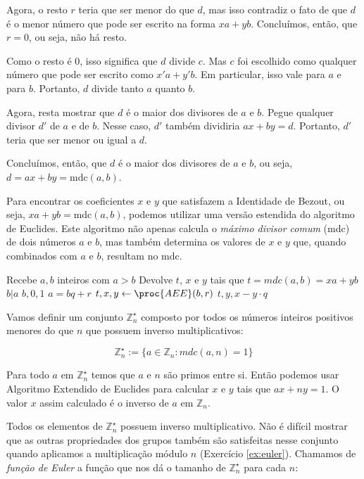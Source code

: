 Agora, o resto $r$ teria que ser menor do que $d$, mas isso contradiz o fato de que $d$ é o menor número que pode ser escrito na forma $xa + yb$.
Concluímos, então, que $r = 0$, ou seja, não há resto.

Como o resto é 0, isso significa que $d$ divide $c$.
Mas $c$ foi escolhido como qualquer número que pode ser escrito como $x'a + y'b$.
Em particular, isso vale para $a$ e para $b$.
Portanto, $d$ divide tanto $a$ quanto $b$.

Agora, resta mostrar que $d$ é o maior dos divisores de $a$ e $b$.
Pegue qualquer divisor $d'$ de $a$ e de $b$.
Nesse caso, $d'$ também dividiria $ax + by = d$.
Portanto, $d'$ teria que ser menor ou igual a $d$.

Concluímos, então, que $d$ é o maior dos divisores de $a$ e $b$, ou seja, $d = ax + by = \text{mdc}(a,b)$.

Para encontrar os coeficientes $x$ e $y$ que satisfazem a Identidade de Bezout, ou seja, $xa + yb = \text{mdc}(a, b)$, podemos utilizar uma versão estendida do algoritmo de Euclides.
Este algoritmo não apenas calcula o {\em máximo divisor comum} (mdc) de dois números $a$ e $b$, mas também determina os valores de $x$ e $y$ que, quando combinados com $a$ e $b$, resultam no mdc.

\begin{codebox}
\li \Comment Recebe $a, b$ inteiros com $a > b$
\li \Comment Devolve $t$, $x$ e $y$ tais que $t = mdc(a,b) = xa + yb$
\li \If $b|a$
\li     \Then
        \Return $b, 0, 1$
\li \Comment $a = bq + r$
\li \Else $t, x, y \gets \proc{AEE}(b, r)$
\li     \Return $t, y, x - y \cdot q$
\End
\end{codebox}

Vamos definir um conjunto $\mathbb{Z}_n^\star$ composto por todos os números inteiros positivos menores do que $n$ que possuem inverso multiplicativos:

\begin{displaymath}
  \mathbb{Z}_n^\star := \{a \in \mathbb{Z}_n : mdc(a,n) = 1\}
\end{displaymath}

Para todo $a$ em $\mathbb{Z}_n^\star$ temos que $a$ e $n$ são primos entre si.
Então podemos usar Algoritmo Extendido de Euclides para calcular $x$ e $y$ tais que $ax + ny = 1$.
O valor $x$ assim calculado é o inverso de $a$ em $\mathbb{Z}_n$.

Todos os elementos de $\mathbb{Z}_n^\star$ possuem inverso multiplicativo.
Não é difícil mostrar que as outras propriedades dos grupos também são satisfeitas nesse conjunto quando aplicamos a multiplicação módulo $n$ (Exercício \ref{ex:euler}).
Chamamos de {\em função de Euler} a função que nos dá o tamanho de $\mathbb{Z}_n^\star$ para cada $n$:


